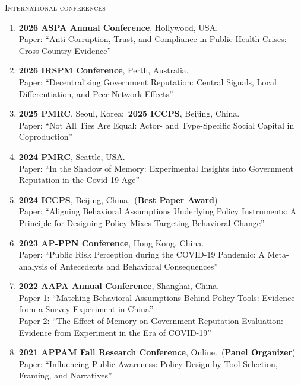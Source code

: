 \documentclass[11pt, a4paper]{article}
\begin{document}
\textsc{International conferences}
\vspace{4pt}
\begin{enumerate}[itemsep=5pt]
    \item \textbf{2026 ASPA Annual Conference}, Hollywood, USA. \\
    Paper: ``Anti-Corruption, Trust, and Compliance in Public Health Crises:
    Cross-Country Evidence''

    \item \textbf{2026 IRSPM Conference}, Perth, Australia. \\
    Paper: ``Decentralising Government Reputation:
    Central Signals, Local Differentiation, and Peer Network Effects''

    \item \textbf{2025 PMRC}, Seoul, Korea;\ \textbf{2025 ICCPS}, Beijing, China. \\
    Paper: ``Not All Ties Are Equal:
    Actor- and Type-Specific Social Capital in Coproduction''

    \item \textbf{2024 PMRC}, Seattle, USA. \\
    Paper: ``In the Shadow of Memory:
    Experimental Insights into Government Reputation in the Covid-19 Age''

    \item \textbf{2024 ICCPS}, Beijing, China.\ (\textbf{Best Paper Award}) \\
    Paper: ``Aligning Behavioral Assumptions Underlying Policy Instruments:
    A Principle for Designing Policy Mixes Targeting Behavioral Change''

    \item \textbf{2023 AP-PPN Conference}, Hong Kong, China. \\
    Paper: ``Public Risk Perception during the COVID-19 Pandemic:
    A Meta-analysis of Antecedents and Behavioral Consequences''

    \item \textbf{2022 AAPA Annual Conference}, Shanghai, China. \\
    Paper 1: ``Matching Behavioral Assumptions Behind Policy Tools:
    Evidence from a Survey Experiment in China'' \\
    Paper 2: ``The Effect of Memory on Government Reputation Evaluation:
    Evidence from Experiment in the Era of COVID-19''

    \item \textbf{2021 APPAM Fall Research Conference}, Online.\ (\textbf{Panel Organizer}) \\
    Paper: ``Influencing Public Awareness:
    Policy Design by Tool Selection, Framing, and Narratives''


\end{enumerate}
\end{document}
